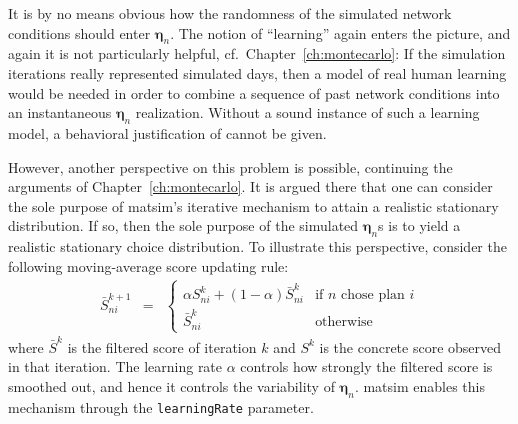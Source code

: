 %
It is by no means obvious how the randomness of the simulated network conditions 
should enter $\boldsymbol{\eta}_n$.
%
%
The notion of {}``learning'' again
enters the picture, and again it is not particularly helpful, cf.~Chapter~\ref{ch:montecarlo}: If the simulation iterations really represented
simulated days, then a model of real human learning would be needed in
order to combine a sequence of past network conditions into an instantaneous
$\boldsymbol{\eta}_n$ realization. Without a sound instance of such a learning model,
a behavioral justification of  cannot
be given.

However, another perspective on this problem is possible, continuing
the arguments of Chapter~\ref{ch:montecarlo}. It is argued there that one can consider
the sole purpose of \gls{matsim}'s iterative mechanism to attain a realistic
stationary distribution. If so, then the sole purpose of the simulated
$\boldsymbol{\eta}_n$s is to yield a realistic stationary choice distribution. To
illustrate this perspective, consider the following moving-average score
updating rule:
\begin{eqnarray}
\bar{S}_{ni}^{k+1} & = & \begin{cases}
\alpha S_{ni}^{k} + (1 - \alpha)\bar{S}_{ni}^{k} & \text{if }n\text{ chose plan }i\\
\bar{S}_{ni}^{k} & \text{otherwise}
\end{cases}
\end{eqnarray}
where $\bar{S}^{k}$ is the filtered score of iteration $k$ and $S^{k}$
is the concrete score observed in that iteration. The learning rate $\alpha$
controls how strongly the filtered score is smoothed out, and hence
it controls the variability of $\boldsymbol{\eta}_n$. \gls{matsim} enables this mechanism
through the \lstinline{learningRate} parameter.

